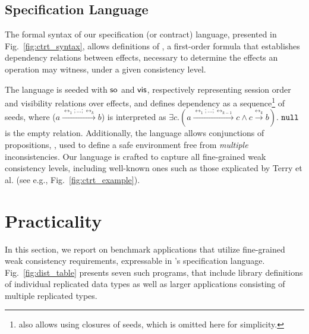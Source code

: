 \documentclass[authorversion]{sig-alternate-05-2015}
\begin{document}
\subsection{Specification Language}
The formal syntax of our specification (or contract) language, presented
in
Fig.~\ref{fig:ctrt_syntax}, allows definitions of
\propS{}, a first-order formula
that establishes dependency relations between effects,
necessary to determine the effects an operation may witness, under
a given consistency level.

The language is seeded with ${\textsf{so}}$ and ${\normalfont \textsf{vis}}$, respectively
representing session
order and visibility relations over effects,
and defines dependency \relationS{} as a sequence\footnote{\tool\; also
	allows
	using closures of seeds, which is omitted here for
simplicity.} of seeds,
where
({\footnotesize $a \xrightarrow{\rel_1;...;\rel_k} b$})
is interpreted as
{\footnotesize$\exists c. (a
	\xrightarrow{\rel_1;...;\rel_{k-1}} c
\wedge c \xrightarrow {\rel_k} b)$}.
$\mathtt{null}{}$ is the empty relation.
Additionally, the language allows conjunctions of propositions,
\specS{},
used to define a safe environment
free from \emph{multiple} inconsistencies.
Our language is crafted to capture all fine-grained weak consistency
levels, including well-known ones such as those explicated by Terry et
al. \cite{terry}
(see e.g., Fig.~\ref{fig:ctrt_example}).





















\section{Practicality}
In this section, we report on
benchmark applications that utilize fine-grained weak consistency
requirements, expressable
in \tool's specification language.
Fig.~\ref{fig:dist_table} presents seven such programs, that include
library definitions of individual replicated data types as well as
larger applications consisting of multiple replicated types.
\end{document}
